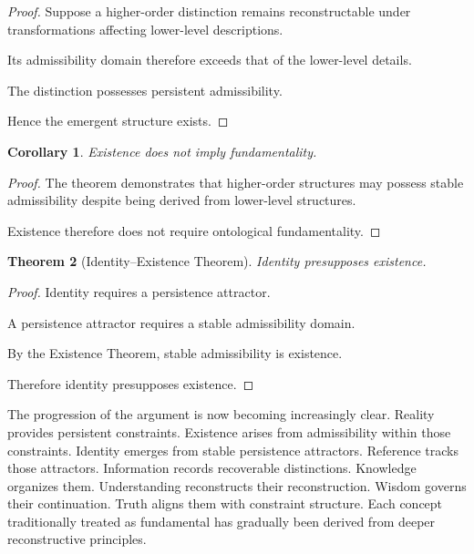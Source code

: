 \documentclass[12pt,oneside]{article}
\newtheorem{theorem}{Theorem}[section] \newtheorem{lemma}[theorem]{Lemma} \newtheorem{proposition}[theorem]{Proposition} \newtheorem{corollary}[theorem]{Corollary}
\theoremstyle{definition}
\begin{document}
\begin{proof}

Suppose a higher-order distinction remains reconstructable under transformations affecting lower-level descriptions.

Its admissibility domain therefore exceeds that of the lower-level details.

The distinction possesses persistent admissibility.

Hence the emergent structure exists.

\end{proof}

\begin{corollary}

Existence does not imply fundamentality.

\end{corollary}

\begin{proof}

The theorem demonstrates that higher-order structures may possess stable admissibility despite being derived from lower-level structures.

Existence therefore does not require ontological fundamentality.

\end{proof}

\begin{theorem}[Identity–Existence Theorem]

Identity presupposes existence.

\end{theorem}

\begin{proof}

Identity requires a persistence attractor.

A persistence attractor requires a stable admissibility domain.

By the Existence Theorem, stable admissibility is existence.

Therefore identity presupposes existence.

\end{proof}

The progression of the argument is now becoming increasingly clear. Reality provides persistent constraints. Existence arises from admissibility within those constraints. Identity emerges from stable persistence attractors. Reference tracks those attractors. Information records recoverable distinctions. Knowledge organizes them. Understanding reconstructs their reconstruction. Wisdom governs their continuation. Truth aligns them with constraint structure. Each concept traditionally treated as fundamental has gradually been derived from deeper reconstructive principles.
\end{document}

